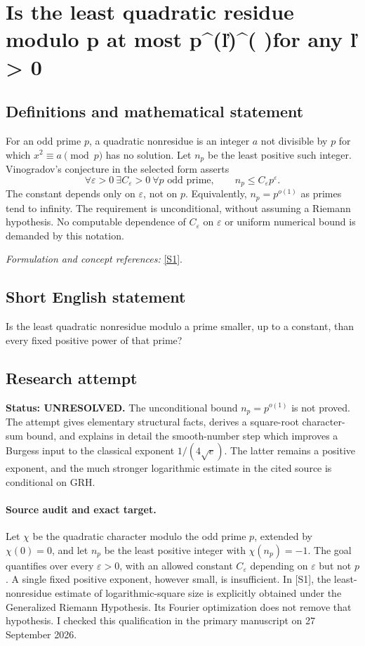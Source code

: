 \documentclass[11pt]{article}
\begin{document}
\section*{\texorpdfstring{Is the least quadratic residue modulo p at most p\textasciicircum{}(ľ)\textasciicircum{}( )for any ľ > 0}{Is the least quadratic residue modulo p at most p\textasciicircum{}(ľ)\textasciicircum{}( )for any ľ > 0}}\label{3100069}
\subsection{Definitions and mathematical statement}
For an odd prime $p$, a quadratic nonresidue is an integer $a$ not divisible by $p$ for which $x^2\equiv a\pmod p$ has no solution. Let $n_p$ be the least positive such integer. Vinogradov's conjecture in the selected form asserts
\[
 \forall{\varepsilon}>0\ \exists C_{\varepsilon}>0\ \forall p\text{ odd prime},
 \qquad n_p\le C_{\varepsilon} p^{\varepsilon}.
\]
The constant depends only on ${\varepsilon}$, not on $p$. Equivalently, $n_p=p^{o(1)}$ as primes tend to infinity. The requirement is unconditional, without assuming a Riemann hypothesis. No computable dependence of $C_{\varepsilon}$ on ${\varepsilon}$ or uniform numerical bound is demanded by this notation.
\par\smallskip\textit{Formulation and concept references:} \href{https://arxiv.org/pdf/2404.08380}{[S1]}.

\subsection{Short English statement}
Is the least quadratic nonresidue modulo a prime smaller, up to a constant, than every fixed positive power of that prime?
\subsection{Research attempt}
\textbf{Status: UNRESOLVED.} The unconditional bound $n_p=p^{o(1)}$ is not proved. The attempt gives elementary structural facts, derives a square-root character-sum bound, and explains in detail the smooth-number step which improves a Burgess input to the classical exponent $1/(4\sqrt e)$. The latter remains a positive exponent, and the much stronger logarithmic estimate in the cited source is conditional on GRH.

\paragraph{Source audit and exact target.}
Let $\chi$ be the quadratic character modulo the odd prime $p$, extended by $\chi(0)=0$, and let $n_p$ be the least positive integer with $\chi(n_p)=-1$. The goal quantifies over every $\varepsilon>0$, with an allowed constant $C_\varepsilon$ depending on $\varepsilon$ but not $p$. A single fixed positive exponent, however small, is insufficient. In [S1], the least-nonresidue estimate of logarithmic-square size is explicitly obtained under the Generalized Riemann Hypothesis. Its Fourier optimization does not remove that hypothesis. I checked this qualification in the primary manuscript on 27 September 2026.
\end{document}
